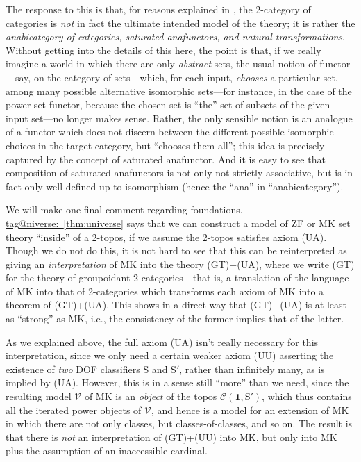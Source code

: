 \documentclass{amsart}
\makeatletter
\newcommand\cC{\mathcal{C}}
\newcommand\cV{\mathcal{V}}
\newcommand\rS{\mathrm{S}}
\newcommand\tm{\mathbf{1}}
\newcommand\tagword[1]{\csname tag@#1\endcsname}
\def\label@tag#1:#2\@nil{#1}
\newcommand\labeltag[1]{\label@tag#1:\@nil}
\newcommand\jref[1]{%
  \texorpdfstring%
    {\hyperref[#1]{\tagword{\labeltag{#1}}~\ref*{#1}}}%
    {\tagword{\labeltag{#1}}~\ref*{#1}}%
}
\theoremstyle{definition}
\theoremstyle{remark}
\theoremstyle{plainwithref}
\makeatother
\begin{document}
The response to this is that, for reasons explained in \cite{makkai-categorical-foundation}, the 2-category of categories is \emph{not} in fact the ultimate intended model of the theory; it is rather the \emph{anabicategory of categories, saturated anafunctors, and natural transformations}.
Without getting into the details of this here, the point is that, if we really imagine a world in which there are only \emph{abstract} sets, the usual notion of functor---say, on the category of sets---which, for each input, \emph{chooses} a particular set, among many possible alternative isomorphic sets---for instance, in the case of the power set functor, because the chosen set is ``the'' set of subsets of the given input set---no longer makes sense.
Rather, the only sensible notion is an analogue of a functor which does not discern between the different possible isomorphic choices in the target category, but ``chooses them all''; this idea is precisely captured by the concept of saturated anafunctor.
And it is easy to see that composition of saturated anafunctors is not only not strictly associative, but is in fact only well-defined up to isomorphism (hence the ``ana'' in ``anabicategory'').

We will make one final comment regarding foundations.
\jref{thm:universe} says that we can construct a model of ZF or MK set theory ``inside'' of a 2-topos, if we assume the 2-topos satisfies axiom (UA).
Though we do not do this, it is not hard to see that this can be reinterpreted as giving an \emph{interpretation} of MK into the theory (GT)+(UA), where we write (GT) for the theory of groupoidant 2-categories---that is, a translation of the language of MK into that of 2-categories which transforms each axiom of MK into a theorem of (GT)+(UA).
This shows in a direct way that (GT)+(UA) is at least as ``strong'' as MK, i.e., the consistency of the former implies that of the latter.

As we explained above, the full axiom (UA) isn't really necessary for this interpretation, since we only need a certain weaker axiom (UU) asserting the existence of \emph{two} DOF classifiers \( \rS \) and \( \rS' \), rather than infinitely many, as is implied by (UA).
However, this is in a sense still ``more'' than we need, since the resulting model \( \cV \) of MK is an \emph{object} of the topos \( \cC(\tm, \rS') \), which thus contains all the iterated power objects of \( \cV \), and hence is a model for an extension of MK in which there are not only classes, but classes-of-classes, and so on.
The result is that there is \emph{not} an interpretation of (GT)+(UU) into MK, but only into MK plus the assumption of an inaccessible cardinal.
\end{document}
